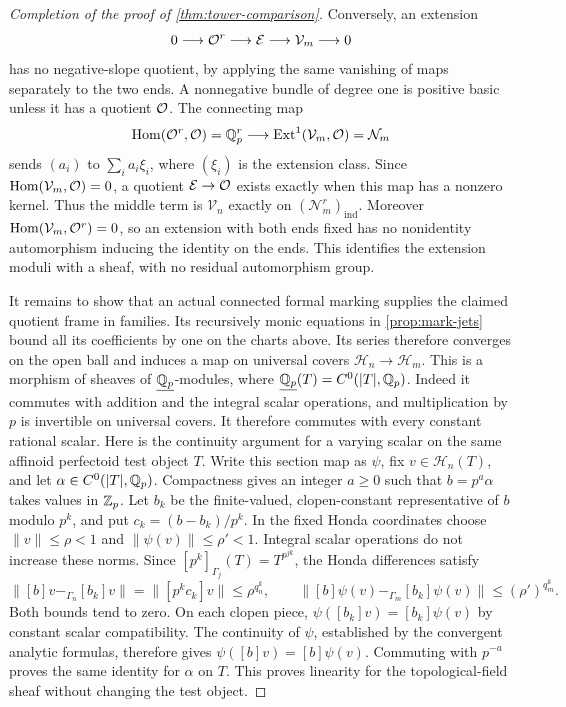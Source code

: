 \begin{proof}[Completion of the proof of \cref{thm:tower-comparison}]
Conversely, an extension
\begin{equation}\label{eq:tower-extension}
 0\longrightarrow\mathcal O^r\longrightarrow\mathcal E
    \longrightarrow\mathcal V_m\longrightarrow0
\end{equation}
has no negative-slope quotient, by applying the same vanishing of
maps separately to the two ends. A nonnegative bundle of degree one
is positive basic unless it has a quotient $\mathcal O$. The connecting map
\[
 \operatorname{Hom}(\mathcal O^r,\mathcal O)=\mathbb Q_p^r
    \longrightarrow\operatorname{Ext}^1(\mathcal V_m,\mathcal O)=\mathcal N_m
\]
sends $(a_i)$ to $\sum_i a_i\xi_i$, where $(\xi_i)$ is the
extension class. Since $\operatorname{Hom}(\mathcal V_m,\mathcal O)=0$, a quotient
$\mathcal E\to\mathcal O$ exists exactly when this map has a nonzero
kernel. Thus the middle term is $\mathcal V_n$ exactly on
$(\mathcal N_m^r)_{\mathrm{ind}}$. Moreover
$\operatorname{Hom}(\mathcal V_m,\mathcal O^r)=0$, so an extension with both ends fixed
has no nonidentity automorphism inducing the identity on the ends.
This identifies the extension moduli with a sheaf, with no residual
automorphism group.

It remains to show that an actual connected formal marking supplies
the claimed quotient frame in families. Its recursively monic equations
in \cref{prop:mark-jets} bound all its coefficients by one on the
charts above. Its series therefore converges on the open ball and
induces a map on universal covers
$\mathcal H_n\to\mathcal H_m$. This is a morphism of sheaves of
$\underline{\mathbb Q_p}$-modules, where
$\underline{\mathbb Q_p}(T)=C^0(|T|,\mathbb Q_p)$. Indeed it commutes with addition
and the integral scalar operations, and multiplication by $p$ is
invertible on universal covers. It therefore commutes with every
constant rational scalar. Here is the continuity argument for a
varying scalar on the same affinoid perfectoid test object $T$.
Write this section map as $\psi$, fix $v\in\mathcal H_n(T)$, and
let $\alpha\in C^0(|T|,\mathbb Q_p)$. Compactness gives an integer $a\geq0$
such that $b=p^a\alpha$ takes values in $\mathbb Z_p$. Let $b_k$ be the
finite-valued, clopen-constant representative of $b$ modulo $p^k$,
and put $c_k=(b-b_k)/p^k$. In the fixed Honda coordinates choose
$\|v\|\leq\rho<1$ and $\|\psi(v)\|\leq\rho'<1$. Integral scalar
operations do not increase these norms. Since
$[p^k]_{\Gamma_j}(T)=T^{p^{jk}}$, the Honda differences satisfy
\[
 \|[b]v-_{\Gamma_n}[b_k]v\|
   =\|[p^k c_k]v\|\leq\rho^{q_n^k},\qquad
 \|[b]\psi(v)-_{\Gamma_m}[b_k]\psi(v)\|
   \leq(\rho')^{q_m^k}.
\]
Both bounds tend to zero. On each clopen piece,
$\psi([b_k]v)=[b_k]\psi(v)$ by constant scalar compatibility.
The continuity of $\psi$, established by the convergent analytic
formulas, therefore gives $\psi([b]v)=[b]\psi(v)$. Commuting with
$p^{-a}$ proves the same identity for $\alpha$ on $T$. This proves
linearity for the topological-field sheaf without changing the test
object.


\end{proof}
